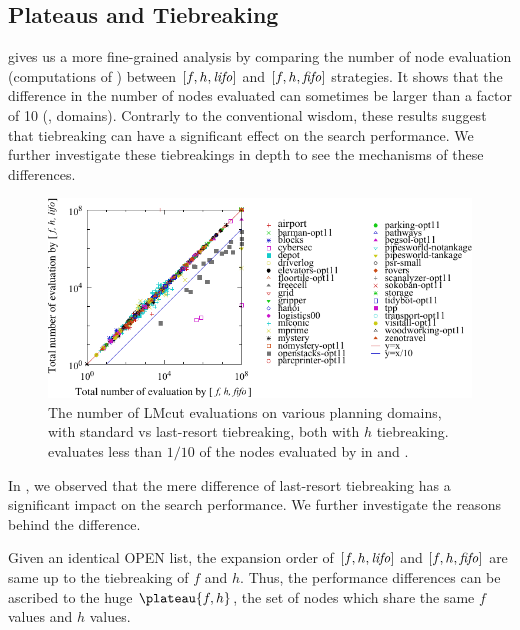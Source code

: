 \subsection{Plateaus and Tiebreaking}

 gives us a
more fine-grained analysis by comparing the number of node evaluation
(computations of \lmcut) between $[f,h,{\mbox{\textit{lifo}}}]$ and $[f,h,{\mbox{\textit{fifo}}}]$ strategies.
It shows that the difference in the number of nodes
evaluated can sometimes be larger than a factor of 10 (,  domains).
Contrarly to the conventional wisdom, 
these results suggest that tiebreaking can have a significant effect on
the search performance. 
We further investigate these tiebreakings in depth to see the mechanisms of
these differences.

\begin{figure}[htbp]
 \centering {}
 \includegraphics{tables/aaai16-30min-5min-cut/aaai16prelim3/evaluated-lmcut_ff-lmcut_lf.pdf}
 \caption{The number of LMcut evaluations on various planning domains,
 with standard \fifo vs \lifo last-resort tiebreaking, both with $h$
 tiebreaking. \lifo evaluates  less than $1/10$ of the nodes evaluated
 by \fifo in  and . 
 }
 \label{fig:f-h-eval}
\end{figure}

In , we observed that the mere difference of
last-resort tiebreaking has a significant impact on the search
performance. We further investigate the reasons behind the difference.

Given an identical OPEN list, the expansion order of $[f,h,{\mbox{\textit{lifo}}}]$ and
$[f,h,{\mbox{\textit{fifo}}}]$ are same up to the tiebreaking of $f$ and $h$. Thus, the
performance differences can be ascribed to the huge $\plateau{f,h}$, the
set of nodes which share the same $f$ values and $h$ values.


